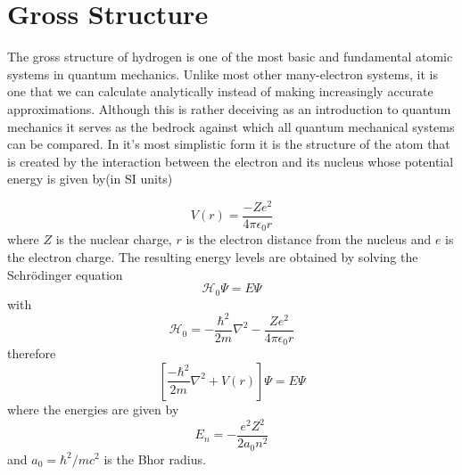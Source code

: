 \section{Gross Structure}
The gross structure of hydrogen is one of the most basic and fundamental atomic systems in quantum mechanics. Unlike most other many-electron systems, it is one that we can calculate analytically instead of making increasingly accurate approximations. Although this is rather deceiving as an introduction to quantum mechanics it serves as the bedrock against which all quantum mechanical systems can be compared. In it's most simplistic form it is the structure of the atom that is created by the interaction between the electron and its nucleus whose potential energy is given by(in SI units) \cite{woodgate}

\begin{equation}
    V(r)=\frac{-Ze^2}{4\pi \epsilon_0 r}
\end{equation}
where $Z$ is the nuclear charge, $r$ is the electron distance from the nucleus and $e$ is the electron charge. The resulting energy levels are obtained by solving the Schr\"{o}dinger equation 
\begin{equation}
    \mathscr{H}_0 \Psi= E\Psi 
\end{equation}
with
\begin{equation}
	     \mathscr{H}_0= -\frac{\hbar^2}{2m}\nabla^2-\frac{Ze^2}{4\pi\epsilon_0 r}
	     \end{equation}
therefore
\begin{equation}
    \left[ \frac{-\hbar^2}{2m}\nabla^2 + V(r) \right] \Psi = E \Psi
\end{equation}
where the energies are given by
\begin{equation}
    E_n = -\frac{e^2 Z^2}{2a_0 n^2}
\end{equation}
and $a_0 = \hbar^2/mc^2$ is the Bhor radius. 
